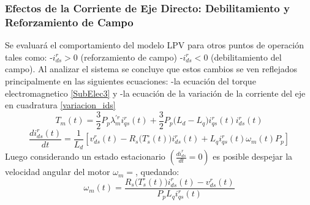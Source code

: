 \documentclass[blue,fullpaper]{ludusofficial}  %
\begin{document}
\subsubsection{Efectos de la Corriente de Eje Directo: Debilitamiento y Reforzamiento de Campo}
Se evaluará el comportamiento del modelo LPV para otros puntos de operación tales como: -$i_{ds}^r>0$ (reforzamiento de campo) -$i_{ds}^r<0$ (debilitamiento del campo). Al analizar el sistema se concluye que estos cambios se ven reflejados principalmente en las siguientes ecuaciones: -la ecuación del torque electromagnetico \ref{SubElec3}   y -la ecuación de la variación de la corriente del eje en cuadratura \ref{variacion_ids} 
$$ T_{m}(t)   = \frac{3}{2}P_{p} \lambda_{m}^{'r} i_{qs}^{r}(t) + \frac{3}{2} P_{p} \Big( L_{d} - L_{q} \Big) i_{qs}^{r}(t) i_{ds}^{r}(t)$$
$$ \frac{di_{ds}^{r}(t)}{dt}  = \frac{1}{L_{d}} \left[ v_{ds}^{r}(t) - R_{s} \Big( T_{s}^{\circ} (t) \Big) i_{ds}^{r}(t) + L_{q}i_{qs}^{r}(t) \omega_{m}(t)P_{p}  \right] $$
Luego considerando un estado estacionario $(\frac{di_{ds}^r}{dt}=0)$ es posible despejar la velocidad angular del motor $\omega_m=$, quedando:
\begin{equation}    
\omega_{m}(t) = \frac{R_{s} \Big( T_{s}^{\circ} (t) \Big) i_{ds}^{r}(t) - v_{ds}^{r}(t)}{P_{p} L_{q} i_{qs}^{r}(t)}
\end{equation}
\end{document}
